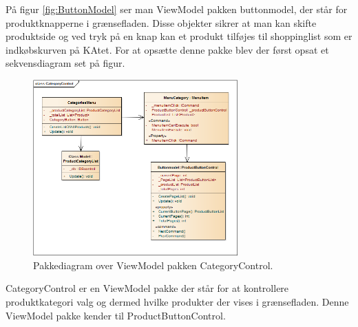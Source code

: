På figur \ref{fig:ButtonModel} ser man ViewModel pakken buttonmodel, der står for produktknapperne i grænsefladen. Disse objekter sikrer at man kan skifte produktside og ved tryk på en knap kan et produkt tilføjes til shoppinglist som er indkøbskurven på \gls{KA}tet. For at opsætte denne pakke blev der først opsat et sekvensdiagram set på figur.

\begin{figure}[H]
	\centering
	\includegraphics[width=0.7\textwidth]{Systemdesign/Frontend/GUI/DesignOgStruktur/Pics/KlassediagramCategoryControl}
	\caption{Pakkediagram over ViewModel pakken CategoryControl.}
	\label{fig:CategoryControl}
\end{figure}

CategoryControl er en ViewModel pakke der står for at kontrollere produktkategori valg og dermed hvilke produkter der vises i grænsefladen. Denne ViewModel pakke kender til ProductButtonControl.

\newpage
